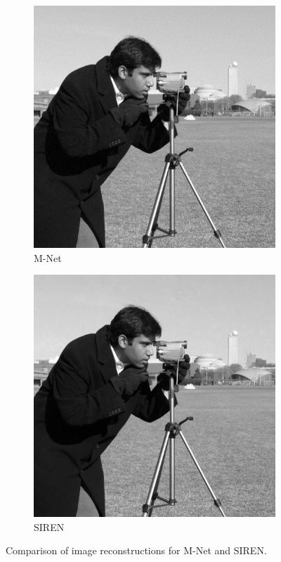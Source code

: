 \begin{figure}[!h]
  \centering
  \begin{subfigure}{0.45\linewidth}
    \centering
  \includegraphics[width=\linewidth]{img/ch5/rec-MR-Net.png}
  \caption{M-Net}
  \end{subfigure}
  \begin{subfigure}{0.45\linewidth}
    \centering
  \includegraphics[width=\linewidth]{img/ch5/rec-SIREN.png}
  \caption{SIREN}
  \end{subfigure}
  \caption{Comparison of image reconstructions for M-Net and SIREN.}
  \label{f:siren}
\end{figure}


